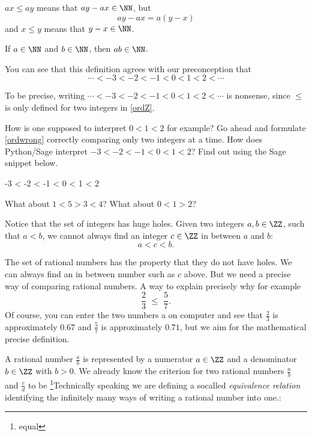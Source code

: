 \documentclass{article}
\begin{document}
\begin{hint}[showhide]
  $a x \leq a y$ means that $a y - a x \in \NN$, but
  $$
  a y - a x = a ( y -  x)
  $$
  and $x \leq y$ means that $y - x\in \NN$.
  
  \begin{hint}[showhide]
    If $a\in \NN$ and $b\in \NN$, then $a b\in \NN$.
  \end{hint}
\end{hint}
\endshex

  


You can
see that this definition agrees with our preconception that
\begin{equation}\label{ordwrong}
\cdots < -3 < -2 < -1 < 0 < 1 < 2 < \cdots
\end{equation}

To be precise, writing $\cdots < -3 < -2 < -1 < 0 < 1 < 2 < \cdots$ is nonsense, since $\leq$ is only defined for two integers in \eqref{ordZ}. 


\begin{exercise}[emph]
  How is one supposed to interpret $0 < 1 < 2$ for example? Go ahead and formulate \eqref{ordwrong} correctly comparing only two integers at a time.
  How does Python/Sage interpret $-3 < -2 < -1< 0 < 1 < 2$? Find out using the Sage snippet below.
  
\begin{sage}
-3 < -2 < -1 < 0 < 1 < 2
\end{sage}
  
  What about $1 < 5 > 3 < 4$? What about $0 < 1 > 2$?
\end{exercise}

Notice that the set of integers has huge holes. Given two integers $a, b\in \ZZ$, such
that $a < b$, we cannot always find an integer $c\in \ZZ$ in between $a$ and $b$:
$$
a < c < b.
$$

The set of rational numbers has the property that they do not have holes. We can
always find an in between number such as $c$ above. But we need a precise way
of comparing rational numbers. A way to explain precisely why for example
$$
\frac{2}{3}\,\, \leq \,\, \frac{5}{7}.
$$
Of course, you can enter the two numbers a on computer and see that
$\frac{2}{3}$ is approximately $0.67$ and $\frac{5}{7}$
is approximately $0.71$, but we aim for the mathematical
precise definition.

A
rational number $\frac{a}{b}$ is represented by a numerator $a\in \ZZ$ and a denominator
$b\in \ZZ$ with $b > 0$. We already know the criterion for two rational numbers
$\frac{a}{b}$ and $\frac{c}{d}$
to be \footnote{equal}{Technically speaking we are defining a socalled \emph{equivalence relation} identifying the infinitely many ways of writing a rational number into one.}:
\end{document}
